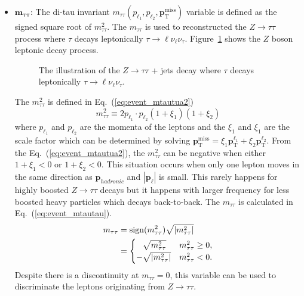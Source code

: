 \begin{itemize}
    \item $\mathbf{m_{\tau\tau}}$: The di-tau invariant $m_{\tau\tau}(p_{\ell_{1}}, p_{\ell_{2}}, \mathbf{p}_{\mathrm{T}}^{\mathrm{miss}})$ variable is defined as the signed square root of $m^{2}_{\tau\tau}$.
    The $m_{\tau\tau}$ is used to reconstructed the $Z \to \tau \tau$ process where $\tau$ decays leptonically $\tau \to \ell \nu_{\ell} \nu_{\tau}$.
    Figure~\ref{fig:event_mtautau} shows the $Z$ boson leptonic decay process.
    \begin{figure}[htb]
        \begin{center}
            
            \caption{The illustration of the $Z \to \tau\tau$ + jets decay where $\tau$ decays leptonically $\tau \to \ell \nu_{\ell} \nu_{\tau}$.}
            \label{fig:event_mtautau}
        \end{center}
    \end{figure}
    The $m^{2}_{\tau\tau}$ is defined in Eq.~(\ref{eq:event_mtautua2})
    \begin{equation}
        m^{2}_{\tau\tau} \equiv 2 p_{\ell_{1}} \cdot p_{\ell_{2}} (1 + \xi_{1})(1+ \xi_{2})
        \label{eq:event_mtautua2}
    \end{equation}
    where $p_{\ell_{1}}$ and $p_{\ell_{2}}$ are the momenta of the leptons and the $\xi_{1}$ and $\xi_{1}$ are the scale factor which can be determined by solving $\mathbf{p}_\mathrm{T}^\mathrm{miss} = \xi_{1} \mathbf{p}_\mathrm{T}^{\ell_{1}} + \xi_{2} \mathbf{p}_\mathrm{T}^{\ell_{2}}$.
    From the Eq.~(\ref{eq:event_mtautua2}), the $m^{2}_{\tau\tau}$ can be negative when either $1 + \xi_{1} < 0$ or $1 + \xi_{2} < 0$.
    This situation occurs when only one lepton moves in the same direction as $\mathbf{p}_{hadronic}$ and $|\mathbf{p}_{\ell}|$ is small. 
    This rarely happens for highly boosted $Z \to \tau \tau$ decays but it happens with larger frequency for less boosted heavy particles which decays back-to-back.
    The $m_{\tau\tau}$ is calculated in Eq.~(\ref{eq:event_mtautau}).
    \begin{align}
        m_{\tau\tau} & = \mathrm{sign}(m^{2}_{\tau\tau}) \sqrt{|m^{2}_{\tau\tau}|}\\
                     & = 
                     \begin{cases}
                         \hphantom{-}\sqrt{m_{\tau\tau}^2}    & m_{\tau\tau}^2 \geq 0,\\
                         -\sqrt{\left| m_{\tau\tau}^2\right|} & m_{\tau\tau}^2 < 0.
                     \end{cases}
        \label{eq:event_mtautau}
    \end{align}
    Despite there is a discontinuity at $m_{\tau\tau} = 0$, this variable can be used to discriminate the leptons originating from $Z\to \tau\tau$.


\end{itemize}
